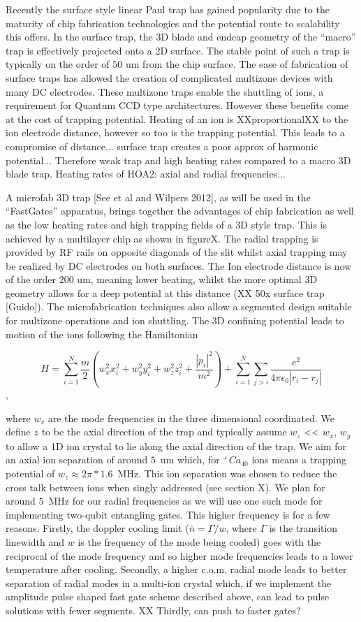 \documentclass[12pt]{iopart}
\begin{document}
Recently the surface style linear Paul
trap has gained popularity due to the maturity of chip fabrication
technologies and the potential route to scalability this offers. In
the surface trap, the 3D blade and endcap geometry of the ``macro''
trap is effectively projected onto a 2D surface. The stable point of
such a trap is typically on the order of $50$ um from the chip
surface. The ease of fabrication of surface traps has allowed the
creation of complicated multizone devices with many DC electrodes.
These multizone traps enable the shuttling of ions, a requirement for
Quantum CCD type architectures. However these benefits come at the
cost of trapping potential. Heating of an ion is XXproportionalXX to
the ion electrode distance, however so too is the trapping
potential. This leads to a compromise of distance... surface trap
creates a poor approx of harmonic potential... Therefore weak trap and
high heating rates compared to a macro 3D blade trap. Heating rates of
HOA2: axial and radial frequencies...

A microfab 3D trap [See et al and Wilpers 2012], as will be used in
the ``FastGates'' apparatus, brings together the advantages of chip
fabrication as well as the low heating rates and high trapping fields
of a 3D style trap. This is achieved by a multilayer chip as shown in
figureX. The radial trapping is provided by RF rails on opposite
diagonals of the slit whilst axial trapping may be realized by DC
electrodes on both surfaces. The Ion electrode distance is now of the
order $200$ um, meaning lower heating, whilst the more optimal 3D
geometry allows for a deep potential at this distance (XX 50x surface trap [Guido]). The
microfabrication techniques also allow a segmented design suitable for
multizone operations and ion shuttling.  The 3D confining potential
leads to motion of the ions following the Hamiltonian

$$ H = \sum_{i=1}^N \frac{m}{2}(w_x^2x_i^2 + w_y^2y_i^2 + w_z^2z_i^2 + \frac{|p_i|^2}{m^2}) + \sum_{i=1}^N\sum_{j>i}\frac{e^2}{4\pi\epsilon_0|r_i - r_j|}$$,

where $w_v$ are the mode frequencies in the three dimensional
coordinated. We define $z$ to be the axial direction of the trap and
typically assume $w_z$ << $w_x$, $w_y$ to allow a 1D ion crystal to
lie along the axial direction of the trap. We aim for an axial ion
separation of around $5$~um which, for $^+Ca_{40}$ ions means a
trapping potential of $w_z \approx 2\pi * 1.6$~MHz. This ion
separation was chosen to reduce the cross talk between ions when
singly addressed (see section X). We plan for around $5$~MHz for our
radial frequencies as we will use one such mode for implementing
two-qubit entangling gates. This higher frequency is for a few
reasons. Firstly, the doppler cooling limit
($\overline{n} = \Gamma/w$, where $\Gamma$ is the transition linewidth
and $w$ is the frequency of the mode being cooled) goes with the
reciprocal of the mode frequency and so higher mode frequencies leads
to a lower temperature after cooling. Secondly, a higher c.o.m. radial
mode leads to better separation of radial modes in a multi-ion crystal
which, if we implement the amplitude pulse shaped fast gate scheme
described above, can lead to pulse solutions with fewer segments. XX
Thirdly, can push to faster gates?
\end{document}
